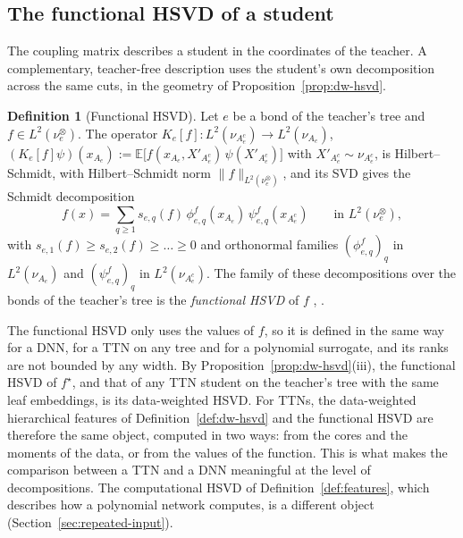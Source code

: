 \documentclass[11pt]{article}
\newcommand{\E}{\mathbb{E}}
\newcommand{\norm}[1]{\lVert #1\rVert}
\theoremstyle{definition}
\newtheorem{definition}[theorem]{Definition}
\numberwithin{equation}{section}
\begin{document}
\subsection{The functional HSVD of a student}\label{sec:student-fsvd}

The coupling matrix describes a student in the coordinates of the teacher. A complementary, teacher-free description uses the student's own decomposition across the same cuts, in the geometry of Proposition~\ref{prop:dw-hsvd}.

\begin{definition}[Functional HSVD]\label{def:fhsvd}
Let $e$ be a bond of the teacher's tree and $f\in L^2(\nu^\otimes_e)$. The operator $K_e[f]:L^2(\nu_{A_e^c})\to L^2(\nu_{A_e})$, $(K_e[f]\psi)(x_{A_e}):=\E\big[f(x_{A_e},X'_{A_e^c})\,\psi(X'_{A_e^c})\big]$ with $X'_{A_e^c}\sim\nu_{A_e^c}$, is Hilbert--Schmidt, with Hilbert--Schmidt norm $\norm{f}_{L^2(\nu^\otimes_e)}$, and its SVD gives the Schmidt decomposition
\begin{equation}\label{eq:student-fsvd}
f(x)=\sum_{q\ge1}s_{e,q}(f)\,\phi^f_{e,q}(x_{A_e})\,\psi^f_{e,q}(x_{A_e^c})\qquad\text{in }L^2(\nu^\otimes_e),
\end{equation}
with $s_{e,1}(f)\ge s_{e,2}(f)\ge\dots\ge0$ and orthonormal families $(\phi^f_{e,q})_q$ in $L^2(\nu_{A_e})$ and $(\psi^f_{e,q})_q$ in $L^2(\nu_{A_e^c})$. The family of these decompositions over the bonds of the teacher's tree is the \emph{functional HSVD} of $f$ \citep[Section~7.4]{hfl_surrogate}, \citep[Section~9.2]{hfl_diagonal}.
\end{definition}

The functional HSVD only uses the values of $f$, so it is defined in the same way for a DNN, for a TTN on any tree and for a polynomial surrogate, and its ranks are not bounded by any width. By Proposition~\ref{prop:dw-hsvd}(iii), the functional HSVD of $f^\star$, and that of any TTN student on the teacher's tree with the same leaf embeddings, is its data-weighted HSVD. For TTNs, the data-weighted hierarchical features of Definition~\ref{def:dw-hsvd} and the functional HSVD are therefore the same object, computed in two ways: from the cores and the moments of the data, or from the values of the function. This is what makes the comparison between a TTN and a DNN meaningful at the level of decompositions. The computational HSVD of Definition~\ref{def:features}, which describes how a polynomial network computes, is a different object (Section~\ref{sec:repeated-input}).
\end{document}
